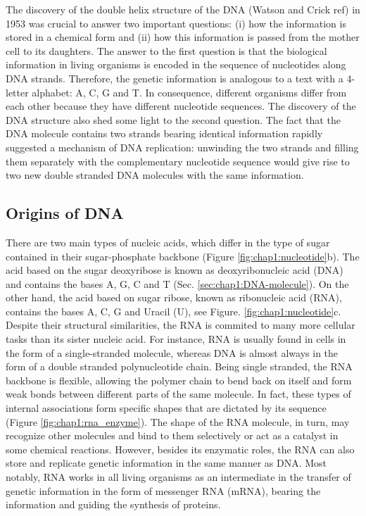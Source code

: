 The discovery of the double helix structure of the DNA (Watson and
Crick ref) in 1953 was crucial to answer two important questions: (i)
how the information is stored in a chemical form and (ii) how this
information is passed from the mother cell to its daughters. The
answer to the first question is that the biological information in
living organisms is encoded in the sequence of nucleotides along DNA
strands. Therefore, the genetic information is analogous to a text
with a 4-letter alphabet: A, C, G and T. In consequence, different
organisms differ from each other because they have different
nucleotide sequences. The discovery of the DNA structure also shed
some light to the second question. The fact that the DNA molecule
contains two strands bearing identical information rapidly suggested
a mechanism of DNA replication: unwinding the two strands and filling
them separately with the complementary nucleotide sequence would give
rise to two new double stranded DNA molecules with the same information.

\subsection{Origins of DNA}
\label{sec:chap1:DNA-origins}
There are two main types of nucleic acids, which differ in the type of
sugar contained in their sugar-phosphate backbone (Figure \ref{fig:chap1:nucleotide}b). The acid based on
the sugar deoxyribose is known as deoxyribonucleic acid (DNA) and
contains the bases A, G, C and T
(Sec. \ref{sec:chap1:DNA-molecule}). On the other hand, the acid based
on sugar ribose, known as ribonucleic acid (RNA), contains the bases
A, C, G and Uracil (U), see
Figure. \ref{fig:chap1:nucleotide}c. Despite their structural
similarities, the RNA is commited to many more cellular tasks than its
sister nucleic acid. For instance, RNA is usually found in cells in the form of a
single-stranded molecule, whereas DNA is almost always in the form of
a double stranded polynucleotide chain. Being single stranded, the RNA
backbone is flexible, allowing the polymer chain to bend back on
itself and form weak bonds between different parts of the same
molecule. In fact, these types of internal associations form
specific shapes that are dictated by its sequence (Figure
\ref{fig:chap1:rna_enzyme}). The shape of the RNA molecule, in turn,
may recognize other molecules and bind to them selectively or act as a
catalyst in some chemical reactions. However, besides its enzymatic
roles, the RNA can also store and replicate genetic information in the same manner
as DNA. Most notably, RNA works in all living organisms as an
intermediate in the transfer of genetic information in the form of
messenger RNA (mRNA), bearing the information and guiding the
synthesis of proteins.

